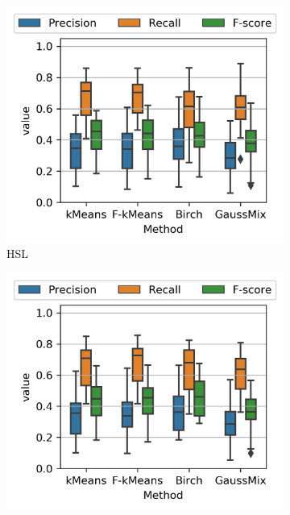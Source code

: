 \documentclass[journal]{IEEEtran}
\begin{document}
\begin{figure}[!t]
    \centering
    \begin{subfigure}[b]{0.30\textwidth}
        \includegraphics[width=\textwidth]{PrecisionRecall_boxplot_const_nclusters_HSL}
        \caption{HSL}
    \end{subfigure}\hfill 
    \begin{subfigure}[b]{0.30\textwidth}
    	\centering
    	\includegraphics[width=\textwidth]{PrecisionRecall_boxplot_const_nclusters_HSV}

\end{subfigure}
\end{figure}
\end{document}
